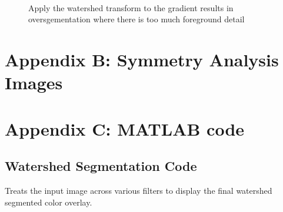 \documentclass[12pt]{article}
\theoremstyle{plain}%
\theoremstyle{definition}
\theoremstyle{remark}
\begin{document}
\begin{figure}[!h]
	\centering
		\mbox{\quad
		}
		\caption{Apply the watershed transform to the gradient results in oversgementation where there is too much foreground detail}
\end{figure}

\section{Appendix B: Symmetry Analysis Images}

\section{Appendix C: \textsc{MATLAB} code}
\subsection{Watershed Segmentation Code}
Treats the input image across various filters to display the final watershed segmented color overlay.
\end{document}
